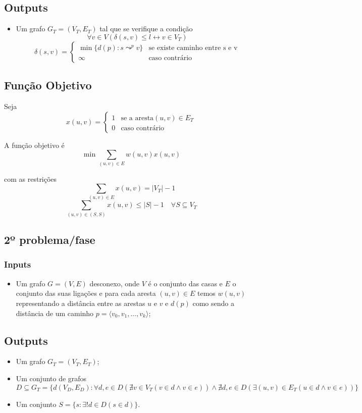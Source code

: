 \documentclass[a4paper,12pt,titlepage]{article}
\let\biconditional\leftrightarrow
\begin{document}
\subsection*{Outputs}
\begin{itemize}
\item Um grafo $G_T = ( V_T,E_T )$ tal que se verifique a condição\cite[p.~643]{intro_algo}
$$ \forall v \in V(\delta(s,v) \leq l \biconditional v \in V_T)$$
$$\delta(s,v) = 
\begin{cases}
\min \{d(p): s \leadsto^p v\} & \text{se existe caminho entre s e v}\\
\infty & \text{caso contrário} 
\end{cases}$$
\end{itemize}

\subsection*{Função Objetivo}
Seja $$x(u,v) = \begin{cases}
1 & \text{se a aresta} (u,v) \in E_T\\
0 & \text{caso contrário} 
\end{cases}$$

A função objetivo é\cite{ieor_mst}
$$\min \sum_{(u,v)\in E} w(u,v)x(u,v)$$

com as restrições 
$$\sum_{(u,v)\in E} x(u,v) = |V_T| - 1$$
$$\sum_{(u,v)\in (S,S)} x(u,v) \leq |S| - 1 \quad \forall S \subseteq  V_T$$

\subsection{2º problema/fase}
\subsubsection*{Inputs}
\begin{itemize}
\item Um grafo  $G= ( V, E ) $ desconexo, onde $V$ é o conjunto das casas e $E$ o conjunto das suas ligações e para cada aresta $(u,v)\in E$ temos $w(u,v)$ representando a distância entre as arestas $u$ e $v$ e $d(p)$ como sendo a distância de um caminho $p = \langle v_0,v_1,\ldots , v_k\rangle$\cite[p.~624]{intro_algo};
\end{itemize}

\subsection*{Outputs}
\begin{itemize}
\item Um grafo $G_T = ( V_T,E_T )$;
\item Um conjunto de grafos $D \subseteq G_T = \{d(V_D,E_D): \forall d,e \in D(\nexists v \in V_T(v \in d \land v \in e)) \land \nexists d,e\in D(\exists(u,v) \in E_T(u \in d \land v \in e)) \}$
\item Um conjunto $S = \{s : \exists! d \in D(s \in d)\}$.
\end{itemize}
\end{document}
